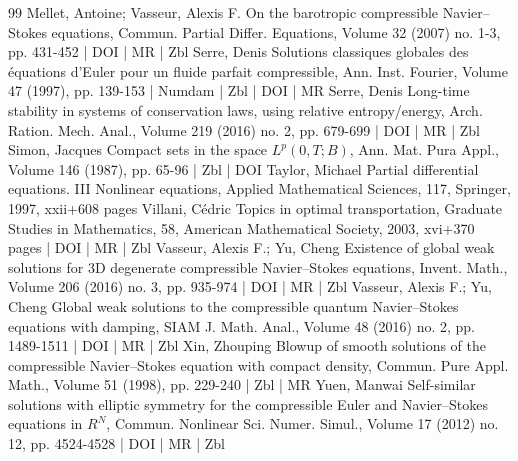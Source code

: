 \documentclass[10pt]{amsart}
\theoremstyle{definition}\newtheorem{defi}[theo]{Definition}\newtheorem{rema}[theo]{Remark}\newtheorem{exam}[theo]{Example}\newtheorem{exem}[theo]{Example}\newtheorem{nota}[theo]{Notation}
\newcommand*\<{\left\langle}
\renewcommand*\>{\right\rangle}
\begin{document}
\begin{thebibliography}{99}
Mellet, Antoine; Vasseur, Alexis F. On the barotropic compressible Navier–Stokes equations, Commun. Partial Differ. Equations, Volume 32 (2007) no. 1-3, pp. 431-452 | DOI | MR | Zbl
Serre, Denis Solutions classiques globales des équations d’Euler pour un fluide parfait compressible, Ann. Inst. Fourier, Volume 47 (1997), pp. 139-153 | Numdam | Zbl | DOI | MR
Serre, Denis Long-time stability in systems of conservation laws, using relative entropy/energy, Arch. Ration. Mech. Anal., Volume 219 (2016) no. 2, pp. 679-699 | DOI | MR | Zbl
Simon, Jacques Compact sets in the space ${L}^ p(0,{T};{B})$, Ann. Mat. Pura Appl., Volume 146 (1987), pp. 65-96 | Zbl | DOI
Taylor, Michael Partial differential equations. III Nonlinear equations, Applied Mathematical Sciences, 117, Springer, 1997, xxii+608 pages
Villani, Cédric Topics in optimal transportation, Graduate Studies in Mathematics, 58, American Mathematical Society, 2003, xvi+370 pages | DOI | MR | Zbl
Vasseur, Alexis F.; Yu, Cheng Existence of global weak solutions for 3D degenerate compressible Navier–Stokes equations, Invent. Math., Volume 206 (2016) no. 3, pp. 935-974 | DOI | MR | Zbl
Vasseur, Alexis F.; Yu, Cheng Global weak solutions to the compressible quantum Navier–Stokes equations with damping, SIAM J. Math. Anal., Volume 48 (2016) no. 2, pp. 1489-1511 | DOI | MR | Zbl
Xin, Zhouping Blowup of smooth solutions of the compressible Navier–Stokes equation with compact density, Commun. Pure Appl. Math., Volume 51 (1998), pp. 229-240 | Zbl | MR
Yuen, Manwai Self-similar solutions with elliptic symmetry for the compressible Euler and Navier–Stokes equations in ${R}^{N}$, Commun. Nonlinear Sci. Numer. Simul., Volume 17 (2012) no. 12, pp. 4524-4528 | DOI | MR | Zbl
\end{thebibliography}
\end{document}
